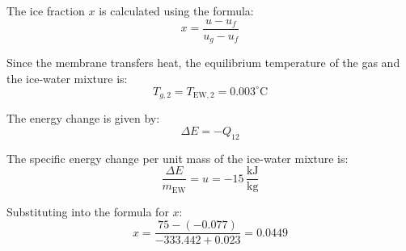 The ice fraction \( x \) is calculated using the formula:  
\[
x = \frac{u - u_f}{u_g - u_f}
\]

Since the membrane transfers heat, the equilibrium temperature of the gas and the ice-water mixture is:  
\[
T_{g,2} = T_{\text{EW},2} = 0.003^\circ\text{C}
\]

The energy change is given by:  
\[
\Delta E = -Q_{12}
\]

The specific energy change per unit mass of the ice-water mixture is:  
\[
\frac{\Delta E}{m_{\text{EW}}} = u = -15 \, \frac{\text{kJ}}{\text{kg}}
\]

Substituting into the formula for \( x \):  
\[
x = \frac{75 - (-0.077)}{-333.442 + 0.023} = 0.0449
\]